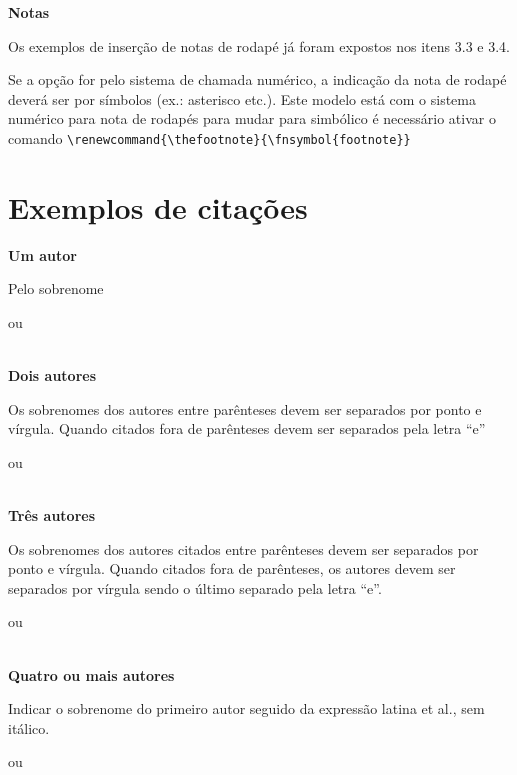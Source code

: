\textbf{Notas}

Os exemplos de inserção de notas de rodapé já foram expostos nos itens 3.3 e 3.4.

Se a opção for pelo sistema de chamada numérico, a indicação da nota de rodapé deverá ser por símbolos (ex.: asterisco etc.). 
Este modelo está com o sistema numérico para nota de rodapés para mudar para simbólico é necessário ativar o comando \verb+\renewcommand{\thefootnote}{\fnsymbol{footnote}}+

\section{Exemplos de citações}

\textbf{Um autor}

Pelo sobrenome\\

\cite{Abreu2015}

ou

\\

\textbf{Dois autores}

Os sobrenomes dos autores entre parênteses devem ser separados por ponto e vírgula. Quando citados fora de parênteses devem ser separados pela letra “e”\\

\cite{simone1977}

ou 

\\


\textbf{Três autores}

Os sobrenomes dos autores citados entre parênteses devem ser separados por ponto e vírgula. Quando citados fora de parênteses, os autores devem ser separados por vírgula sendo o último separado pela letra “e”.\\

\cite{Giannini2000}

ou

\\

\textbf{Quatro ou mais autores}

Indicar o sobrenome do primeiro autor seguido da expressão latina et al., sem itálico.\\

\cite{Meyaard2003}

ou

\\


